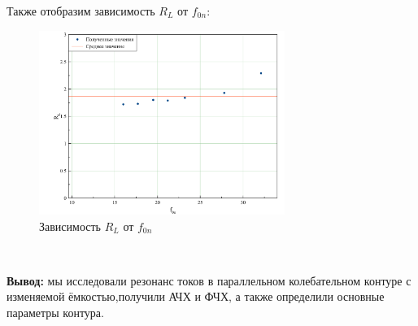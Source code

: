 \documentclass{physlab}
\begin{document}
Также отобразим зависимость $R_L$ от $f_{0n}$:

\begin{minipage}[H]{0.49\linewidth}
\begin{figure}[H]
	\includegraphics[width=80mm]{RL}
	\caption{Зависимость $R_L$ от $f_{0n}$}
\end{figure}
\end{minipage}
~
\begin{minipage}[H]{0.49\linewidth}
	\textbf{Вывод:} мы исследовали резонанс токов в параллельном колебательном контуре с изменяемой ёмкостью,получили АЧХ и ФЧХ, а также определили основные параметры контура.
\end{minipage}
\end{document}
